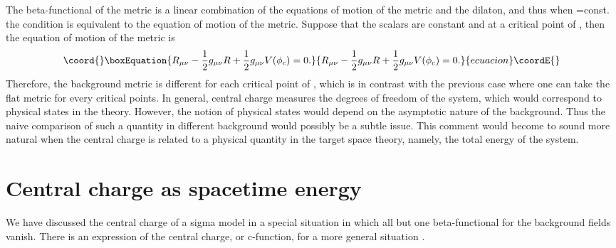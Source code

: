 \documentclass[a4paper,a4paper]{article}
\begin{document}
The beta-functional \coordHE{} of the metric is a linear combination of the equations of motion of the metric and 
the dilaton, and thus when \myHighlight{$\Phi$}\coordHE{}=const. the condition \coordHE{} is equivalent to the equation of motion 
of the metric. 
Suppose that the scalars are constant and at a critical point of \coordHE{}, then the equation of motion of the 
metric is 
\begin{equation}\coord{}\boxEquation{
R_{\mu\nu}-\frac12g_{\mu\nu}R+\frac12g_{\mu\nu}V(\phi_c) = 0.
}{
R_{\mu\nu}-\frac12g_{\mu\nu}R+\frac12g_{\mu\nu}V(\phi_c) = 0.
}{ecuacion}\coordE{}\end{equation}
Therefore, the background metric is different for each critical point of \coordHE{}, which is in contrast with the 
previous case where one can take the flat metric for every critical points. 
In general, central charge measures the degrees of freedom of the system, which would correspond to physical 
states in the theory. 
However, the notion of physical states would depend on the asymptotic nature of the background. 
Thus the naive comparison of such a quantity in different background would possibly be a subtle issue. 
This comment would become to sound more natural when the central charge is related to a physical quantity in the 
target space theory, namely, the total energy of the system. 




















\vspace{1cm}

\section{Central charge as spacetime energy} \label{center}

\vspace{5mm}

We have discussed the central charge of a sigma model in a special situation in which all but one beta-functional 
for the background fields vanish. 
There is an expression of the central charge, or c-function, for a more general situation \cite{Tseytlin}. 
\end{document}
